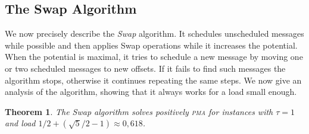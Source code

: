 \documentclass[10pt, conference, letterpaper]{IEEEtran}
\newtheorem{theorem}{Theorem}
\newcommand\pma{\textsc{pma}\xspace}
\begin{document}
\subsection{The Swap Algorithm}


We now precisely describe the \emph{Swap} algorithm. It schedules unscheduled messages while possible and then applies Swap operations while it increases the potential. When the potential is maximal, it tries to schedule a new message by moving one or two scheduled messages to new offsets. If it fails to find such messages the algorithm stops, otherwise 
it continues repeating the same steps. We now give an analysis of the algorithm, showing that it always works for a load small enough.

\begin{theorem}
The Swap algorithm solves positively \pma for instances with $\tau =1$ and load $1/2 + (\sqrt{5}/2 -1) \approx 0,618$.
\end{theorem}
\end{document}
